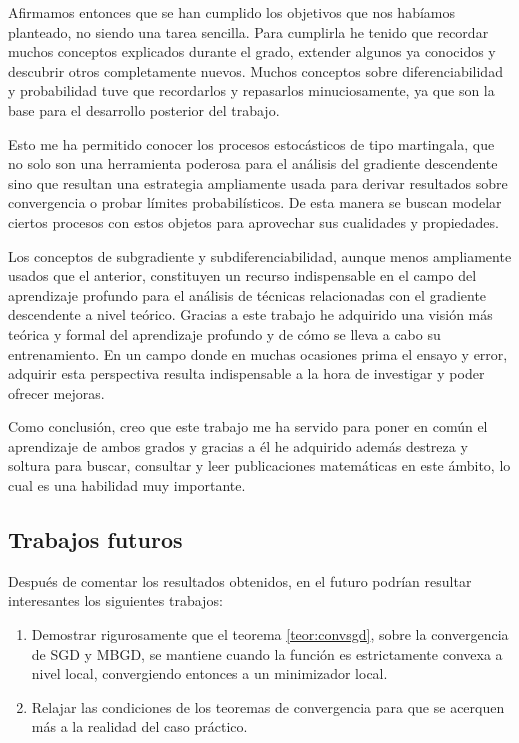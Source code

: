 Afirmamos entonces que se han cumplido los objetivos que nos habíamos planteado, no siendo una tarea sencilla. Para cumplirla he tenido que recordar muchos conceptos explicados durante el grado, extender algunos ya conocidos y descubrir otros completamente nuevos. Muchos conceptos sobre diferenciabilidad y probabilidad tuve que recordarlos y repasarlos minuciosamente, ya que son la base para el desarrollo posterior del trabajo.

Esto me ha permitido conocer los procesos estocásticos de tipo martingala, que no solo son una herramienta poderosa para el análisis del gradiente descendente sino que resultan una estrategia ampliamente usada para derivar resultados sobre convergencia o probar límites probabilísticos. De esta manera se buscan modelar ciertos procesos con estos objetos para aprovechar sus cualidades y propiedades.

Los conceptos de subgradiente y subdiferenciabilidad, aunque menos ampliamente usados que el anterior, constituyen un recurso indispensable en el campo del aprendizaje profundo para el análisis de técnicas relacionadas con el gradiente descendente a nivel teórico. Gracias a este trabajo he adquirido una visión más teórica y formal del aprendizaje profundo y de cómo se lleva a cabo su entrenamiento. En un campo donde en muchas ocasiones prima el ensayo y error, adquirir esta perspectiva resulta indispensable a la hora de investigar y poder ofrecer mejoras.

Como conclusión, creo que este trabajo me ha servido para poner en común el aprendizaje de ambos grados y gracias a él he adquirido además destreza y soltura para buscar, consultar y leer publicaciones matemáticas en este ámbito, lo cual es una habilidad muy importante.







\subsection{Trabajos futuros} 

Después de comentar los resultados obtenidos, en el futuro podrían resultar interesantes los siguientes trabajos:

\begin{enumerate}
	\item Demostrar rigurosamente que el teorema \ref{teor:convsgd}, sobre la convergencia de SGD y MBGD, se mantiene cuando la función es estrictamente convexa a nivel local, convergiendo entonces a un minimizador local.
	
	\item Relajar las condiciones de los teoremas de convergencia para que se acerquen más a la realidad del caso práctico.
\end{enumerate}

